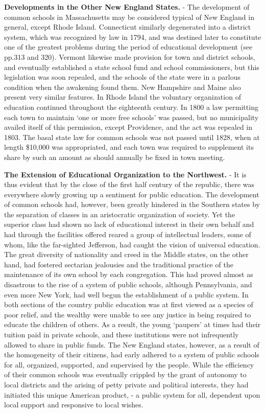 \documentclass[
]{book}
\begin{document}
\textbf{Developments in the Other New England States.} - The development of common schools in Massachusetts may be considered typical of New England in general, except Rhode Island. Connecticut similarly degenerated into a district system, which was recognized by law in 1794, and was destined later to constitute one of the greatest problems during the period of educational development (see pp.313 and 320). Vermont likewise made provision for town and district schools, and eventually established a state school fund and school commissioners, but this legislation was soon repealed, and the schools of the state were in a parlous condition when the awakening found them. New Hampshire and Maine also present very similar features. In Rhode Island the voluntary organization of education continued throughout the eighteenth century. In 1800 a law permitting each town to maintain `one or more free schools' was passed, but no municipality availed itself of this permission, except Providence, and the act was repealed in 1803. The basal state law for common schools was not passed until 1828, when at length \$10,000 was appropriated, and each town was required to supplement its share by such an amount as should annually be fixed in town meeting.

\textbf{The Extension of Educational Organization to the Northwest.} - It is thus evident that by the close of the first half century of the republic, there was everywhere slowly growing up a sentiment for public education. The development of common schools had, however, been greatly hindered in the Southern states by the separation of classes in an aristocratic organization of society. Yet the superior class had shown no lack of educational interest in their own behalf and had through the facilities offered reared a group of intellectual leaders, some of whom, like the far-sighted Jefferson, had caught the vision of universal education. The great diversity of nationality and creed in the Middle states, on the other hand, had fostered sectarian jealousies and the traditional practice of the maintenance of its own school by each congregation. This had proved almost as disastrous to the rise of a system of public schools, although Pennsylvania, and even more New York, had well begun the establishment of a public system. In both sections of the country public education was at first viewed as a species of poor relief, and the wealthy were unable to see any justice in being required to educate the children of others. As a result, the young `paupers' at times had their tuition paid in private schools, and these institutions were not infrequently allowed to share in public funds. The New England states, however, as a result of the homogeneity of their citizens, had early adhered to a system of public schools for all, organized, supported, and supervised by the people. While the efficiency of their common schools was eventually crippled by the grant of autonomy to local districts and the arising of petty private and political interests, they had initiated this unique American product, - a public system for all, dependent upon local support and responsive to local wishes.
\end{document}

